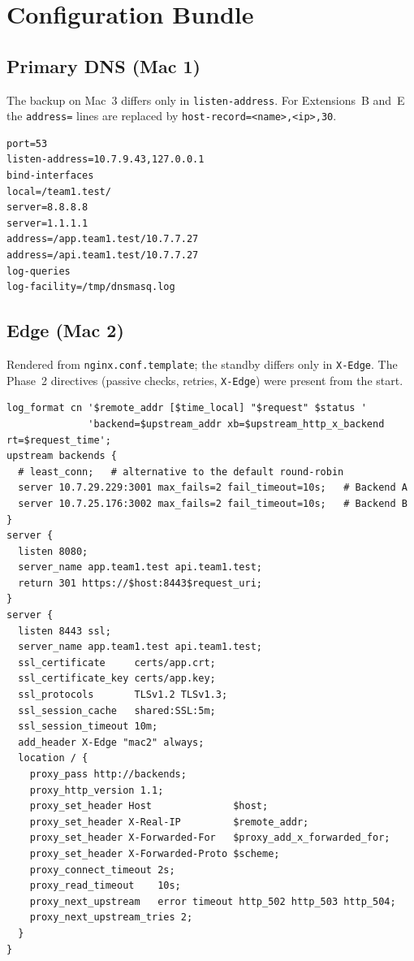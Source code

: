 \documentclass[conference,a4paper]{IEEEtran}
\newcommand{\code}[1]{\texttt{#1}}
\begin{document}
\appendices

\section{Configuration Bundle}
\label{app:config}

\subsection{Primary DNS (Mac 1)}
The backup on Mac~3 differs only in \code{listen-address}. For Extensions~B and~E the
\code{address=} lines are replaced by \code{host-record=<name>,<ip>,30}.
\begin{lstlisting}[caption={dnsmasq.conf generated on Mac 1},label={lst:dnsmasq}]
port=53
listen-address=10.7.9.43,127.0.0.1
bind-interfaces
local=/team1.test/
server=8.8.8.8
server=1.1.1.1
address=/app.team1.test/10.7.7.27
address=/api.team1.test/10.7.7.27
log-queries
log-facility=/tmp/dnsmasq.log
\end{lstlisting}

\subsection{Edge (Mac 2)}
Rendered from \code{nginx.conf.template}; the standby differs only in \code{X-Edge}. The Phase~2
directives (passive checks, retries, \code{X-Edge}) were present from the start.
\begin{lstlisting}[caption={nginx configuration (essential parts)},label={lst:nginx}]
log_format cn '$remote_addr [$time_local] "$request" $status '
              'backend=$upstream_addr xb=$upstream_http_x_backend rt=$request_time';
upstream backends {
  # least_conn;   # alternative to the default round-robin
  server 10.7.29.229:3001 max_fails=2 fail_timeout=10s;   # Backend A
  server 10.7.25.176:3002 max_fails=2 fail_timeout=10s;   # Backend B
}
server {
  listen 8080;
  server_name app.team1.test api.team1.test;
  return 301 https://$host:8443$request_uri;
}
server {
  listen 8443 ssl;
  server_name app.team1.test api.team1.test;
  ssl_certificate     certs/app.crt;
  ssl_certificate_key certs/app.key;
  ssl_protocols       TLSv1.2 TLSv1.3;
  ssl_session_cache   shared:SSL:5m;
  ssl_session_timeout 10m;
  add_header X-Edge "mac2" always;
  location / {
    proxy_pass http://backends;
    proxy_http_version 1.1;
    proxy_set_header Host              $host;
    proxy_set_header X-Real-IP         $remote_addr;
    proxy_set_header X-Forwarded-For   $proxy_add_x_forwarded_for;
    proxy_set_header X-Forwarded-Proto $scheme;
    proxy_connect_timeout 2s;
    proxy_read_timeout    10s;
    proxy_next_upstream   error timeout http_502 http_503 http_504;
    proxy_next_upstream_tries 2;
  }
}
\end{lstlisting}
\end{document}
